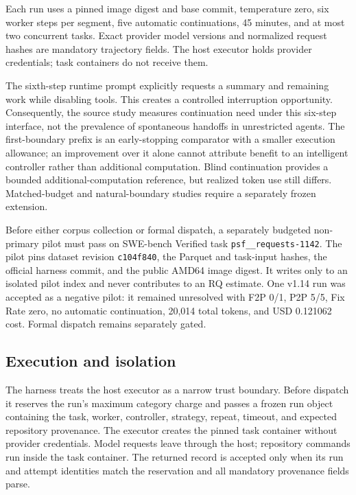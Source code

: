 \documentclass[sigconf,nonacm]{acmart}
\begin{document}
Each run uses a pinned image digest and base commit, temperature zero, six worker steps per segment, five automatic continuations, 45 minutes, and at most two concurrent tasks. Exact provider model versions and normalized request hashes are mandatory trajectory fields. The host executor holds provider credentials; task containers do not receive them.

The sixth-step runtime prompt explicitly requests a summary and remaining work while disabling tools. This creates a controlled interruption opportunity. Consequently, the source study measures continuation need under this six-step interface, not the prevalence of spontaneous handoffs in unrestricted agents. The first-boundary prefix is an early-stopping comparator with a smaller execution allowance; an improvement over it alone cannot attribute benefit to an intelligent controller rather than additional computation. Blind continuation provides a bounded additional-computation reference, but realized token use still differs. Matched-budget and natural-boundary studies require a separately frozen extension.

Before either corpus collection or formal dispatch, a separately budgeted non-primary pilot must pass on SWE-bench Verified task \texttt{psf\_\_requests-1142}. The pilot pins dataset revision \texttt{c104f840}, the Parquet and task-input hashes, the official harness commit, and the public AMD64 image digest. It writes only to an isolated pilot index and never contributes to an RQ estimate. One v1.14 run was accepted as a negative pilot: it remained unresolved with F2P 0/1, P2P 5/5, Fix Rate zero, no automatic continuation, 20,014 total tokens, and USD 0.121062 cost. Formal dispatch remains separately gated.

\subsection{Execution and isolation}

The harness treats the host executor as a narrow trust boundary. Before dispatch it reserves the run's maximum category charge and passes a frozen run object containing the task, worker, controller, strategy, repeat, timeout, and expected repository provenance. The executor creates the pinned task container without provider credentials. Model requests leave through the host; repository commands run inside the task container. The returned record is accepted only when its run and attempt identities match the reservation and all mandatory provenance fields parse.
\end{document}
